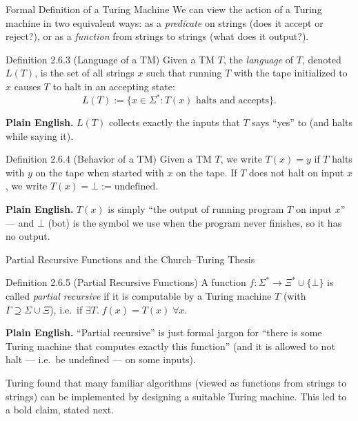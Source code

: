 \documentclass[aspectratio=169,10pt]{beamer}
\begin{document}
\begin{frame}[allowframebreaks]{Formal Definition of a Turing Machine}
  We can view the action of a Turing machine in two equivalent ways: as a
  \emph{predicate} on strings (does it accept or reject?), or as a
  \emph{function} from strings to strings (what does it output?).

  \begin{block}{Definition 2.6.3 (Language of a TM)}
    Given a TM $T$, the \emph{language} of $T$, denoted $L(T)$, is the set of
    all strings $x$ such that running $T$ with the tape initialized to $x$
    causes $T$ to halt in an accepting state:
    \[
      L(T) := \{ x \in \Sigma^{*} : T(x) \text{ halts and accepts} \}.
    \]
  \end{block}
  \textbf{Plain English.} $L(T)$ collects exactly the inputs that $T$ says
  ``yes'' to (and halts while saying it).

  \begin{block}{Definition 2.6.4 (Behavior of a TM)}
    Given a TM $T$, we write $T(x) = y$ if $T$ halts with $y$ on the tape when
    started with $x$ on the tape. If $T$ does not halt on input $x$, we write
    $T(x) = \bot := \text{undefined}$.
  \end{block}
  \textbf{Plain English.} $T(x)$ is simply ``the output of running program $T$
  on input $x$'' --- and $\bot$ (bot) is the symbol we use when the program
  never finishes, so it has no output.
\end{frame}

\begin{frame}{Partial Recursive Functions and the Church--Turing Thesis}
  \begin{block}{Definition 2.6.5 (Partial Recursive Functions)}
    A function $f : \Sigma^{*} \to \Xi^{*} \cup \{\bot\}$ is called
    \emph{partial recursive} if it is computable by a Turing machine $T$
    (with $\Gamma \supseteq \Sigma \cup \Xi$), i.e.\ if
    $\exists T.\; f(x) = T(x)\; \forall x$.
  \end{block}
  \textbf{Plain English.} ``Partial recursive'' is just formal jargon for
  ``there is some Turing machine that computes exactly this function'' (and it
  is allowed to not halt --- i.e.\ be undefined --- on some inputs).

  \vspace{2mm}
  Turing found that many familiar algorithms (viewed as functions from strings
  to strings) can be implemented by designing a suitable Turing machine. This
  led to a bold claim, stated next.
\end{frame}
\end{document}
